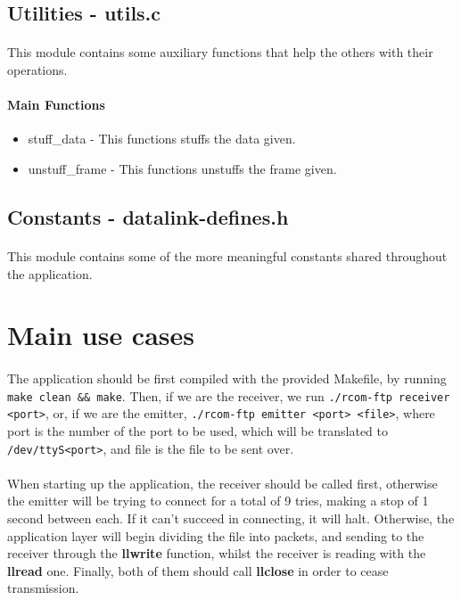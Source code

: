 \documentclass[11pt]{article}
\begin{document}
\subsection{Utilities - utils.c}

\paragraph{}This module contains some auxiliary functions that help the others with their operations.

\paragraph{Main Functions}

\begin{itemize}
        \item{stuff\_data - This functions stuffs the data given.}
        \item{unstuff\_frame - This functions unstuffs the frame given.}
\end{itemize}

\subsection{Constants - datalink-defines.h}

\paragraph{}This module contains some of the more meaningful constants shared throughout the application.

\section{Main use cases}

\paragraph{}The application should be first compiled with the provided Makefile, by running
\verb|make clean && make|. Then, if we are the receiver, we run \verb|./rcom-ftp receiver <port>|, or, if we
are the emitter, \verb|./rcom-ftp emitter <port> <file>|, where port is the number of the port to be used,
which will be translated to \verb|/dev/ttyS<port>|, and file is the file to be sent over.

\paragraph{} When starting up the application, the receiver should be called first, otherwise the emitter
will be trying to connect for a total of 9 tries, making a stop of 1 second between each. If it can't
succeed in connecting, it will halt. Otherwise, the application layer will begin dividing the file into
packets, and sending to the receiver through the \textbf{llwrite} function, whilst the receiver is reading
with the \textbf{llread} one. Finally, both of them should call \textbf{llclose} in order to cease
transmission.
\end{document}
